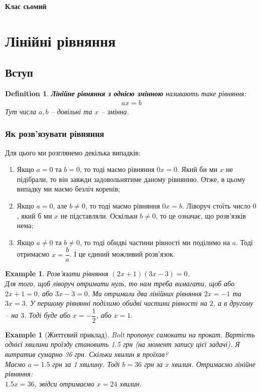 \documentclass[a4paper, 10pt]{article}
\theoremstyle{theoremdd}
\theoremstyle{theoremdd}
\newtheorem{definition}[theorem]{Definition}
\theoremstyle{theoremdd}
\theoremstyle{theoremdd}
\newtheorem{example}[theorem]{Example}
\theoremstyle{theoremdd}
\theoremstyle{theoremdd}
\theoremstyle{theoremdd}
\theoremstyle{theoremdd}
\begin{document}
\newpage
{\Huge \textbf{Клас сьомий}}
\section{Лінійні рівняння}
\subsection{Вступ}
\begin{definition}
\textbf{Лінійне рівняння з однією змінною} називають таке рівняння:
\begin{align*}
ax = b
\end{align*}
Тут числа $a,b$ -- довільні та $x$ -- змінна.
\end{definition}

\subsubsection*{Як розв'язувати рівняння}
Для цього ми розглянемо декілька випадків:
\begin{enumerate}[wide=0pt,label={\arabic*)}]
\item Якщо $a = 0$ та $b = 0$, то тоді маємо рівняння $0x = 0$. Який би ми $x$ не підібрали, то він завжди задовольнятиме даному рівнянню. Отже, в цьому випадку ми маємо безліч коренів;
\item Якщо $a = 0$, але $b \neq 0$, то тоді маємо рівняння $0x = b$. Ліворуч стоїть число $0$, який б ми $x$ не підставляли. Оскільки $b \neq 0$, то це означає, що розв'язків нема;
\item Якщо $a \neq 0$ та $b \neq 0$, то тоді обидві частини рівності ми поділимо на $a$. Тоді отримаємо $x = \dfrac{b}{a}$. І це єдиний можливий розв'язок.
\end{enumerate}

\begin{example}
Розв'язати рівняння $(2x + 1)(3x - 3) = 0$.\\
Для того, щоб ліворуч отримати нуль, то нам треба вимагати, щоб або $2x + 1 = 0$, або $3x - 3 = 0$. Ми отримали два лінійних рівняння $2x = -1$ та $3x = 3$. У першому рівнянні поділимо обидві частини рівності на $2$, а в другому -- на $3$. Тоді буде або $x = -\dfrac{1}{2}$, або $x = 1$.
\end{example}

\begin{example}[Життєвий приклад]
Bolt пропонує самокати на прокат. Вартість однієї хвилини проїзду становить 1.5 грн (на момент запису цієї задачі). Я витратив сумарно 36 грн. Скільки хвилин я проїхав?\\
Маємо $a = 1.5$ грн за 1 хвилину. Тоді $b = 36$ грн за $x$ хвилин. Отримаємо лінійне рівняння:\\
$1.5x = 36$, звідси отримаємо $x = 24$ хвилин.
\end{example}
\end{document}
